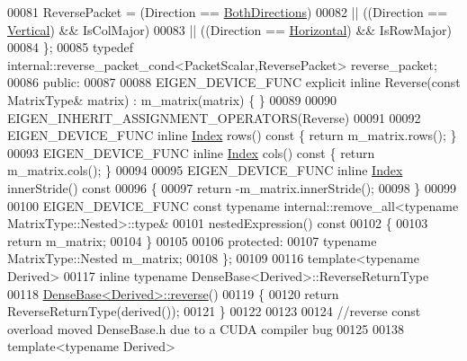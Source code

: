 \begin{DoxyCode}
00081       ReversePacket = (Direction == \hyperlink{group__enums_ggad49a7b3738e273eb00932271b36127f7aa01e40fce022901560ce6d9fdee2fde3}{BothDirections})
00082                     || ((Direction == \hyperlink{group__enums_ggad49a7b3738e273eb00932271b36127f7addca718e0564723df21d61b94b1198be}{Vertical})   && IsColMajor)
00083                     || ((Direction == \hyperlink{group__enums_ggad49a7b3738e273eb00932271b36127f7aae8a16b3b9272683c1162915f6d892be}{Horizontal}) && IsRowMajor)
00084     \};
00085     \textcolor{keyword}{typedef} internal::reverse\_packet\_cond<PacketScalar,ReversePacket> reverse\_packet;
00086   \textcolor{keyword}{public}:
00087 
00088     EIGEN\_DEVICE\_FUNC \textcolor{keyword}{explicit} \textcolor{keyword}{inline} Reverse(\textcolor{keyword}{const} MatrixType& matrix) : m\_matrix(matrix) \{ \}
00089 
00090     EIGEN\_INHERIT\_ASSIGNMENT\_OPERATORS(Reverse)
00091 
00092     EIGEN\_DEVICE\_FUNC \textcolor{keyword}{inline} \hyperlink{namespace_eigen_a62e77e0933482dafde8fe197d9a2cfde}{Index} rows()\textcolor{keyword}{ const }\{ \textcolor{keywordflow}{return} m\_matrix.rows(); \}
00093     EIGEN\_DEVICE\_FUNC \textcolor{keyword}{inline} \hyperlink{namespace_eigen_a62e77e0933482dafde8fe197d9a2cfde}{Index} cols()\textcolor{keyword}{ const }\{ \textcolor{keywordflow}{return} m\_matrix.cols(); \}
00094 
00095     EIGEN\_DEVICE\_FUNC \textcolor{keyword}{inline} \hyperlink{namespace_eigen_a62e77e0933482dafde8fe197d9a2cfde}{Index} innerStride()\textcolor{keyword}{ const}
00096 \textcolor{keyword}{    }\{
00097       \textcolor{keywordflow}{return} -m\_matrix.innerStride();
00098     \}
00099 
00100     EIGEN\_DEVICE\_FUNC \textcolor{keyword}{const} \textcolor{keyword}{typename} internal::remove\_all<typename MatrixType::Nested>::type&
00101     nestedExpression()\textcolor{keyword}{ const }
00102 \textcolor{keyword}{    }\{
00103       \textcolor{keywordflow}{return} m\_matrix;
00104     \}
00105 
00106   \textcolor{keyword}{protected}:
00107     \textcolor{keyword}{typename} MatrixType::Nested m\_matrix;
00108 \};
00109 
00116 \textcolor{keyword}{template}<\textcolor{keyword}{typename} Derived>
00117 \textcolor{keyword}{inline} \textcolor{keyword}{typename} DenseBase<Derived>::ReverseReturnType
00118 \hyperlink{group___core___module_a38ea394036d8b096abf322469c80198f}{DenseBase<Derived>::reverse}()
00119 \{
00120   \textcolor{keywordflow}{return} ReverseReturnType(derived());
00121 \}
00122 
00123 
00124 \textcolor{comment}{//reverse const overload moved DenseBase.h due to a CUDA compiler bug}
00125 
00138 \textcolor{keyword}{template}<\textcolor{keyword}{typename} Derived>

\end{DoxyCode}
